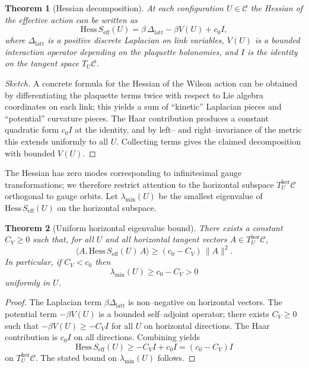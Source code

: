 \documentclass[11pt]{article}
\newtheorem{theorem}{Theorem}[section]
\begin{document}
\begin{theorem}[Hessian decomposition]
At each configuration $U\in\mathcal{C}$ the Hessian of the effective
action can be written as
\begin{equation}
  \mathrm{Hess}\,S_{\mathrm{eff}}(U)
  = \beta\,\Delta_{\mathrm{latt}} - \beta V(U) + c_0 I,
\end{equation}
where $\Delta_{\mathrm{latt}}$ is a positive discrete Laplacian on link
variables, $V(U)$ is a bounded interaction operator depending on the
plaquette holonomies, and $I$ is the identity on the tangent space
$T_U\mathcal{C}$.
\end{theorem}

\begin{proof}[Sketch]
A concrete formula for the Hessian of the Wilson action can be obtained
by differentiating the plaquette terms twice with respect to Lie algebra
coordinates on each link; this yields a sum of ``kinetic'' Laplacian
pieces and ``potential'' curvature pieces. The Haar contribution
produces a constant quadratic form $c_0 I$ at the identity, and by
left-- and right--invariance of the metric this extends uniformly to all
$U$. Collecting terms gives the claimed decomposition with bounded
$V(U)$.
\end{proof}

The Hessian has zero modes corresponding to infinitesimal gauge
transformations; we therefore restrict attention to the horizontal
subspace $T^{\mathrm{hor}}_U\mathcal{C}$ orthogonal to gauge orbits.
Let $\lambda_{\min}(U)$ be the smallest eigenvalue of
$\mathrm{Hess}\,S_{\mathrm{eff}}(U)$ on the horizontal subspace.

\begin{theorem}[Uniform horizontal eigenvalue bound]
There exists a constant $C_V\ge 0$ such that, for all $U$ and all
horizontal tangent vectors $A\in T^{\mathrm{hor}}_U\mathcal{C}$,
\begin{equation}
  \langle A, \mathrm{Hess}\,S_{\mathrm{eff}}(U)\,A\rangle
  \ge (c_0 - C_V)\,\|A\|^2.
\end{equation}
In particular, if $C_V<c_0$ then
\begin{equation}
  \lambda_{\min}(U) \ge c_0 - C_V > 0
\end{equation}
uniformly in $U$.
\end{theorem}

\begin{proof}
The Laplacian term $\beta\Delta_{\mathrm{latt}}$ is non--negative on
horizontal vectors. The potential term $-\beta V(U)$ is a bounded
self--adjoint operator; there exists $C_V\ge 0$ such that
$-\beta V(U)\ge -C_V I$ for all $U$ on horizontal directions. The Haar
contribution is $c_0 I$ on all directions. Combining yields
\begin{equation}
  \mathrm{Hess}\,S_{\mathrm{eff}}(U)
  \ge -C_V I + c_0 I = (c_0-C_V)I
\end{equation}
on $T^{\mathrm{hor}}_U\mathcal{C}$. The stated bound on
$\lambda_{\min}(U)$ follows.
\end{proof}
\end{document}
